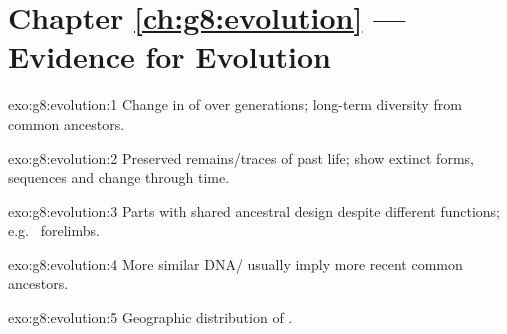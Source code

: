 \section*{Chapter \ref{ch:g8:evolution} --- Evidence for Evolution}

\begin{solution}{exo:g8:evolution:1}
Change in  of  over generations; long-term
diversity from common ancestors.
\end{solution}

\begin{solution}{exo:g8:evolution:2}
Preserved remains/traces of past life; show extinct forms, sequences and
change through time.
\end{solution}

\begin{solution}{exo:g8:evolution:3}
Parts with shared ancestral design despite different functions; e.g.\
 forelimbs.
\end{solution}

\begin{solution}{exo:g8:evolution:4}
More similar DNA/ usually imply more recent common ancestors.
\end{solution}

\begin{solution}{exo:g8:evolution:5}
Geographic distribution of .
\end{solution}

